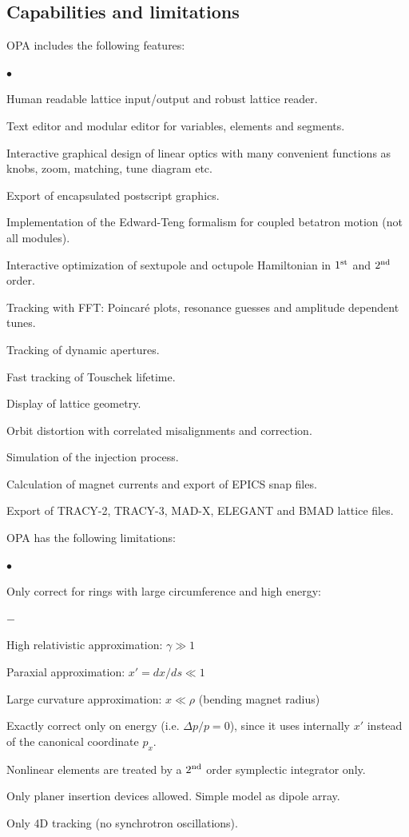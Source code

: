 \documentclass[12pt]{article}
\newenvironment{mylist}
  {\begin{list}{$\bullet$}{\parsep 0pt}}
  {\end{list}}
\newenvironment{mysublist}
  {\begin{list}{$-$}{\parsep 0pt \topsep 0pt \leftmargin 2cm}}
  {\end{list}}
\begin{document}
\subsection{Capabilities and limitations}
OPA includes the following features:
\begin{mylist}
\item Human readable lattice input/output and robust lattice reader.
\item Text editor and modular editor for variables, elements and segments.
\item Interactive graphical design of linear optics with many convenient functions as knobs, zoom, matching, tune diagram etc.
\item Export of encapsulated postscript graphics.
\item Implementation of the Edward-Teng formalism for coupled betatron motion (not all modules).
\item Interactive optimization of sextupole and octupole Hamiltonian in $1^{\rm st}$ and $2^{\rm nd}$ order.
\item Tracking with FFT: Poincar\'e plots, resonance guesses and amplitude dependent tunes.
\item Tracking of dynamic apertures.
\item Fast tracking of Touschek lifetime.
\item Display of lattice geometry.
\item Orbit distortion with correlated misalignments and correction.
\item Simulation of the injection process.
\item Calculation of magnet currents and export of EPICS snap files.
\item Export of TRACY-2, TRACY-3, MAD-X, ELEGANT and BMAD lattice files.
\end{mylist}

OPA has the following limitations:
\begin{mylist}
\item Only correct for rings with large circumference and high energy:
\begin{mysublist}
\item High relativistic approximation: $\gamma \gg 1$
\item Paraxial approximation: $x' = dx / ds \ll 1$
\item Large curvature approximation: $x \ll \rho$ (bending magnet radius)
\end{mysublist}
\item Exactly correct only on energy (i.e. $\Delta p/p = 0$),
since it uses internally $x'$  instead of the canonical coordinate $p_x$.
\item Nonlinear elements are treated by a $2^{\rm nd}$ order symplectic integrator only.
\item Only planer insertion devices allowed. Simple model as dipole array.
\item Only 4D tracking (no synchrotron oscillations).
\end{mylist}
\end{document}
